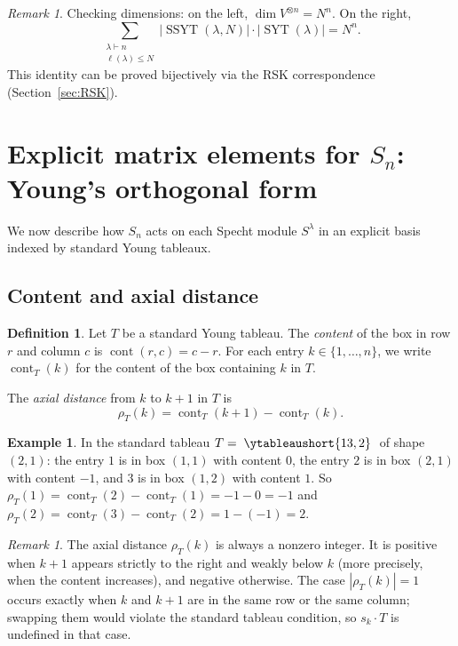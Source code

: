 \documentclass[12pt,a4paper]{article}
\theoremstyle{definition}
\newtheorem{definition}[theorem]{Definition}
\newtheorem{example}[theorem]{Example}
\theoremstyle{remark}
\newtheorem{remark}[theorem]{Remark}
\newcommand{\SYT}{\operatorname{SYT}}
\newcommand{\SSYT}{\operatorname{SSYT}}
\newcommand{\cont}{\operatorname{cont}}
\begin{document}
\begin{remark}
Checking dimensions: on the left, $\dim V^{\otimes n} = N^n$. On the
right,
\[
  \sum_{\substack{\lambda \vdash n \\ \ell(\lambda) \leqslant N}}
  |\SSYT(\lambda, N)| \cdot |\SYT(\lambda)| = N^n.
\]
This identity can be proved bijectively via the RSK correspondence
(Section~\ref{sec:RSK}).
\end{remark}

\section{Explicit matrix elements for $S_n$: Young's orthogonal form}
\label{sec:Young}

We now describe how $S_n$ acts on each Specht module $S^\lambda$ in
an explicit basis indexed by standard Young tableaux.

\subsection{Content and axial distance}

\begin{definition}\label{def:content}
Let $T$ be a standard Young tableau. The \emph{content} of the box in
row $r$ and column $c$ is $\cont(r,c) = c - r$. For each entry
$k \in \{1, \ldots, n\}$, we write $\cont_T(k)$ for the content of
the box containing $k$ in $T$.

The \emph{axial distance} from $k$ to $k{+}1$ in $T$ is
\begin{equation}\label{eq:axial}
  \rho_T(k) = \cont_T(k{+}1) - \cont_T(k).
\end{equation}
\end{definition}

\begin{example}
In the standard tableau $T = \;\ytableaushort{13,2}\;$ of shape
$(2,1)$: the entry $1$ is in box $(1,1)$ with content $0$, the entry $2$ is
in box $(2,1)$ with content $-1$, and $3$ is in box $(1,2)$ with
content $1$. So $\rho_T(1) = \cont_T(2) - \cont_T(1) = -1 - 0 = -1$
and $\rho_T(2) = \cont_T(3) - \cont_T(2) = 1 - (-1) = 2$.
\end{example}

\begin{remark}
The axial distance $\rho_T(k)$ is always a nonzero integer. It is
positive when $k{+}1$ appears strictly to the right and weakly below
$k$ (more precisely, when the content increases), and negative
otherwise. The case $|\rho_T(k)| = 1$ occurs exactly when $k$ and
$k{+}1$ are in the same row or the same column; swapping them would
violate the standard tableau condition, so $s_k \cdot T$ is undefined
in that case.
\end{remark}
\end{document}
